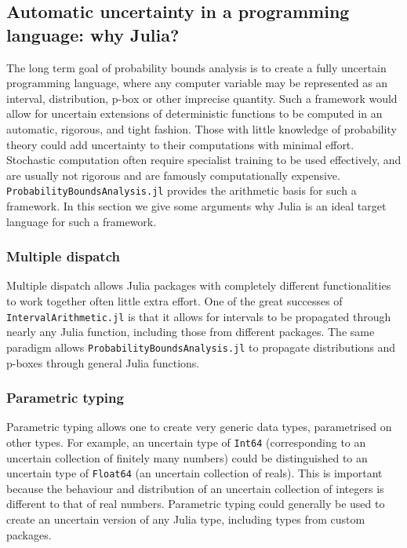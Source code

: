 \documentclass{juliacon}
\begin{document}
\subsection{Automatic uncertainty in a programming language: why Julia?}
The long term goal of probability bounds analysis is to create a fully uncertain programming language, where any computer variable may be represented as an interval, distribution, p-box or other imprecise quantity. Such a framework would allow for uncertain extensions of deterministic functions to be computed in an automatic, rigorous, and tight fashion. Those with little knowledge of probability theory could add uncertainty to their computations with minimal effort. Stochastic computation often require specialist training to be used effectively, and are usually not rigorous and are famously computationally expensive. \texttt{ProbabilityBoundsAnalysis.jl} provides the arithmetic basis for such a framework. In this section we give some arguments why Julia \cite{bezanson2017julia} is an ideal target language for such a framework.

\subsubsection{Multiple dispatch}
Multiple dispatch allows Julia packages with completely different functionalities to work together often little extra effort. One of the great successes of \texttt{IntervalArithmetic.jl} is that it allows for intervals to be propagated through nearly any Julia function, including those from different packages. The same paradigm allows \texttt{ProbabilityBoundsAnalysis.jl} to propagate distributions and p-boxes through general Julia functions.

\subsubsection{Parametric typing}
Parametric typing allows one to create very generic data types, parametrised on other types. For example, an uncertain type of \texttt{Int64} (corresponding to an uncertain collection of finitely many numbers) could be distinguished to an uncertain type of \texttt{Float64} (an uncertain collection of reals). This is important because the behaviour and distribution of an uncertain collection of integers is different to that of real numbers. Parametric typing could generally be used to create an uncertain version of any Julia type, including types from custom packages.
\end{document}

